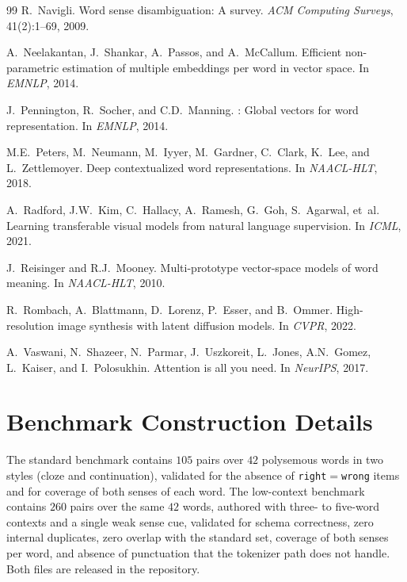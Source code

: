 \documentclass[twoside,11pt]{article}
\begin{document}
\begin{thebibliography}{99}
R.~Navigli.
\newblock Word sense disambiguation: A survey.
\newblock \emph{ACM Computing Surveys}, 41(2):1--69, 2009.

A.~Neelakantan, J.~Shankar, A.~Passos, and A.~McCallum.
\newblock Efficient non-parametric estimation of multiple embeddings per word in vector space.
\newblock In \emph{EMNLP}, 2014.

J.~Pennington, R.~Socher, and C.D.~Manning.
: Global vectors for word representation.
\newblock In \emph{EMNLP}, 2014.

M.E.~Peters, M.~Neumann, M.~Iyyer, M.~Gardner, C.~Clark, K.~Lee, and L.~Zettlemoyer.
\newblock Deep contextualized word representations.
\newblock In \emph{NAACL-HLT}, 2018.

A.~Radford, J.W.~Kim, C.~Hallacy, A.~Ramesh, G.~Goh, S.~Agarwal, et~al.
\newblock Learning transferable visual models from natural language supervision.
\newblock In \emph{ICML}, 2021.

J.~Reisinger and R.J.~Mooney.
\newblock Multi-prototype vector-space models of word meaning.
\newblock In \emph{NAACL-HLT}, 2010.

R.~Rombach, A.~Blattmann, D.~Lorenz, P.~Esser, and B.~Ommer.
\newblock High-resolution image synthesis with latent diffusion models.
\newblock In \emph{CVPR}, 2022.

A.~Vaswani, N.~Shazeer, N.~Parmar, J.~Uszkoreit, L.~Jones, A.N.~Gomez, L.~Kaiser, and I.~Polosukhin.
\newblock Attention is all you need.
\newblock In \emph{NeurIPS}, 2017.

\end{thebibliography}

\appendix

\section{Benchmark Construction Details}
\label{app:bench}

The standard benchmark contains $105$ pairs over $42$ polysemous words in two styles (cloze and continuation), validated for the absence of \texttt{right}$=$\texttt{wrong} items and for coverage of both senses of each word. The low-context benchmark contains $260$ pairs over the same $42$ words, authored with three- to five-word contexts and a single weak sense cue, validated for schema correctness, zero internal duplicates, zero overlap with the standard set, coverage of both senses per word, and absence of punctuation that the tokenizer path does not handle. Both files are released in the repository.
\end{document}
